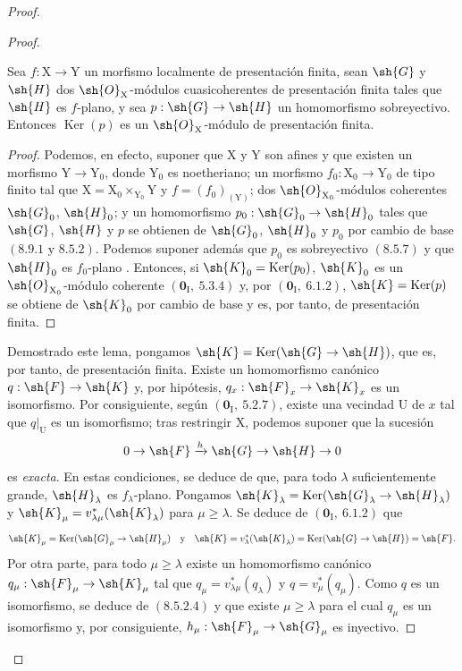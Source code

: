 \begin{proof}
\begin{proof}
\begin{lemma}[11.3.9.1]
\label{IV.11.3.9.1}
Sea $f:\mathrm{X}\to\mathrm{Y}$ un morfismo localmente de presentación finita, sean $\sh{G}$ y $\sh{H}$ dos $\sh{O}_\mathrm{X}$-módulos cuasicoherentes de presentación finita tales que $\sh{H}$ es $f$-plano, y sea $p:\sh{G}\to\sh{H}$ un homomorfismo sobreyectivo. Entonces $\operatorname{Ker}(p)$ es un $\sh{O}_\mathrm{X}$-módulo de presentación finita.
\end{lemma}

\begin{proof}
Podemos, en efecto, suponer que $\mathrm{X}$ y $\mathrm{Y}$ son afines y que existen un morfismo $\mathrm{Y}\to\mathrm{Y}_0$, donde $\mathrm{Y}_0$ es noetheriano; un morfismo $f_0:\mathrm{X}_0\to\mathrm{Y}_0$ de tipo finito tal que $\mathrm{X}=\mathrm{X}_0\times_{\mathrm{Y}_0}\mathrm{Y}$ y $f=(f_0)_{(\mathrm{Y})}$; dos $\sh{O}_{\mathrm{X}_0}$-módulos coherentes $\sh{G}_0$, $\sh{H}_0$; y un homomorfismo $p_0:\sh{G}_0\to\sh{H}_0$ tales que $\sh{G}$, $\sh{H}$ y $p$ se obtienen de $\sh{G}_0$, $\sh{H}_0$ y $p_0$ por cambio de base $(8.9.1\text{ y }8.5.2)$. Podemos suponer además que $p_0$ es sobreyectivo $(8.5.7)$ y que $\sh{H}_0$ es $f_0$-plano . Entonces, si $\sh{K}_0=\operatorname{Ker}(p_0)$, $\sh{K}_0$ es un $\sh{O}_{\mathrm{X}_0}$-módulo coherente $(\mathbf{0}_\mathrm{I},~5.3.4)$ y, por $(\mathbf{0}_\mathrm{I},~6.1.2)$, $\sh{K}=\operatorname{Ker}(p)$ se obtiene de $\sh{K}_0$ por cambio de base y es, por tanto, de presentación finita.
\end{proof}

Demostrado este lema, pongamos $\sh{K}=\operatorname{Ker}(\sh{G}\to\sh{H})$, que es, por tanto, de presentación finita. Existe un homomorfismo canónico $q:\sh{F}\to\sh{K}$ y, por hipótesis, $q_x:\sh{F}_x\to\sh{K}_x$ es un isomorfismo. Por consiguiente, según $(\mathbf{0}_\mathrm{I},~5.2.7)$, existe una vecindad $\mathrm{U}$ de $x$ tal que $q|_{\mathrm{U}}$ es un isomorfismo; tras restringir $\mathrm{X}$, podemos suponer que la sucesión
\[
  0\to\sh{F}\xrightarrow{h}\sh{G}\to\sh{H}\to 0
\]
es \emph{exacta}. En estas condiciones, se deduce de  que, para todo $\lambda$ suficientemente grande, $\sh{H}_\lambda$ es $f_\lambda$-plano. Pongamos $\sh{K}_\lambda=\operatorname{Ker}(\sh{G}_\lambda\to\sh{H}_\lambda)$ y $\sh{K}_\mu=v^*_{\lambda\mu}(\sh{K}_\lambda)$ para $\mu\geqslant\lambda$. Se deduce de $(\mathbf{0}_\mathrm{I},~6.1.2)$ que
\[
  \sh{K}_\mu=\operatorname{Ker}(\sh{G}_\mu\to\sh{H}_\mu)
  \quad\text{y}\quad
  \sh{K}=v^*_\lambda(\sh{K}_\lambda)
  =\operatorname{Ker}(\sh{G}\to\sh{H})=\sh{F}.
\]
Por otra parte, para todo $\mu\geqslant\lambda$ existe un homomorfismo canónico $q_\mu:\sh{F}_\mu\to\sh{K}_\mu$ tal que $q_\mu=v^*_{\lambda\mu}(q_\lambda)$ y $q=v^*_\mu(q_\mu)$. Como $q$ es un isomorfismo, se deduce de $(8.5.2.4)$ y  que existe $\mu\geqslant\lambda$ para el cual $q_\mu$ es un isomorfismo y, por consiguiente, $h_\mu:\sh{F}_\mu\to\sh{G}_\mu$ es inyectivo.
\end{proof}


\end{proof}
